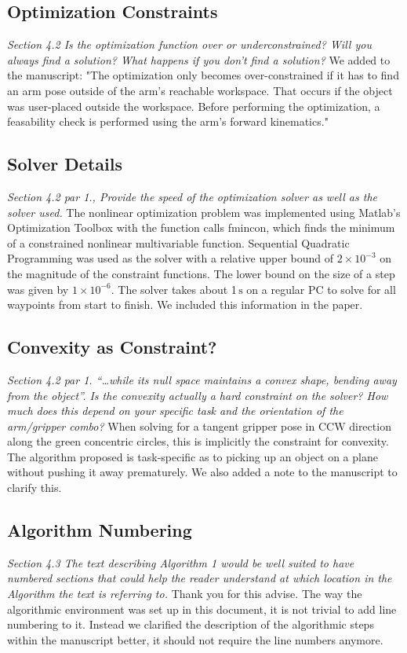 \documentclass[letterpaper, 10 pt, twocolumn, conference]{article}
\newcommand{\unit}[1]{\ensuremath{\, \mathrm{#1}}} %
\begin{document}
\subsection{Optimization Constraints}
\textit{Section 4.2 Is the optimization function over or underconstrained? Will you always find a solution? What happens if you don’t find a solution?}
%
We added to the manuscript: "The optimization only becomes over-constrained if it has to find an arm pose outside of the arm's reachable workspace. That occurs if the object was user-placed outside the workspace. Before performing the optimization, a feasability check is performed using the arm's forward kinematics."
%
\subsection{Solver Details}
\textit{Section 4.2 par 1., Provide the speed of the optimization solver as well as the solver used.}
%
The nonlinear optimization problem was implemented using Matlab’s Optimization Toolbox with the function calls fmincon, which finds the minimum of a constrained nonlinear multivariable function. Sequential Quadratic Programming was used as the solver with a relative upper bound of $2 \times 10^{-3}$ on the magnitude of the constraint functions. The lower bound on the size of a step was given by $1 \times 10^{-6}$. The solver takes about 1\unit{s} on a regular PC to solve for all waypoints from start to finish. We included this information in the paper.
%
\subsection{Convexity as Constraint?}
\textit{Section 4.2 par 1. “…while its null space maintains a convex shape, bending away from the object”. Is the convexity actually a hard constraint on the solver? How much does this depend on your specific task and the orientation of the arm/gripper combo?}
%
When solving for a tangent gripper pose in CCW direction along the green concentric circles, this is implicitly the constraint for convexity. The algorithm proposed is task-specific as to picking up an object on a plane without pushing it away prematurely. We also added a note to the manuscript to clarify this.
%
\subsection{Algorithm Numbering}
\textit{Section 4.3 The text describing Algorithm 1 would be well suited to have numbered sections that could help the reader understand at which location in the Algorithm the text is referring to.}
%
Thank you for this advise. The way the algorithmic environment was set up in this document, it is not trivial to add line numbering to it. Instead we clarified the description of the algorithmic steps within the manuscript better, it should not require the line numbers anymore. 
%
\end{document}
